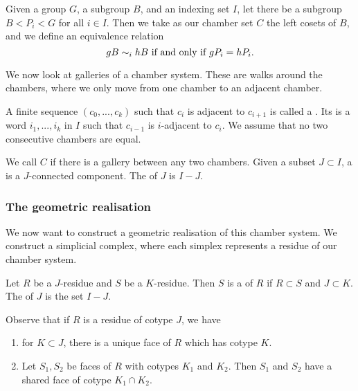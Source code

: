 \documentclass[11pt]{article}
\begin{document}
\begin{example}\cite[?]{RON}
    Given a group $G$, a subgroup $B$, and an indexing set $I$, let there be a subgroup $B<P_i<G$ for all $i\in I$. Then we take as our chamber set $C$ the left cosets of $B$, and we define an equivalence relation
    \[gB\sim_{i}hB \textnormal{ if and only if }gP_i=hP_i.\]
\end{example}

We now look at galleries of a chamber system. These are walks around the chambers, where we only move from one chamber to an adjacent chamber. 

\begin{definition}\cite[?]{RON}
    A finite sequence $(c_0,...,c_k)$ such that $c_i$ is adjacent to $c_{i+1}$ is called a . Its  is a word $i_1,...,i_k$ in $I$ such that  $c_{i-1}$ is $i$-adjacent to $c_{i}$. We assume that no two consecutive chambers are equal.
\end{definition}

\begin{definition}\cite[?]{RON}
    We call $C$  if there is a gallery between any two chambers. Given a subset $J\subset I$, a  is a $J$-connected component. The  of $J$ is $I-J$. 
\end{definition}


\subsubsection{The geometric realisation}

We now want to construct a geometric realisation of this chamber system. We construct a simplicial complex, where each simplex represents a residue of our chamber system.

\begin{definition}
    Let $R$ be a $J$-residue and $S$ be a $K$-residue. Then $S$ is a  of $R$ if $R\subset S$ and $J\subset K$. The  of $J$ is the set $I-J$. 
\end{definition}


Observe that if $R$ is a residue of cotype $J$, we have
\begin{enumerate}
    \item for $K\subset J$, there is a unique face of $R$ which has cotype $K$.
    \item Let $S_1,S_2$ be faces of $R$ with cotypes $K_1$ and $K_2$. Then $S_1$ and $S_2$ have a shared face of cotype $K_1\cap K_2$. 
\end{enumerate}
\end{document}
